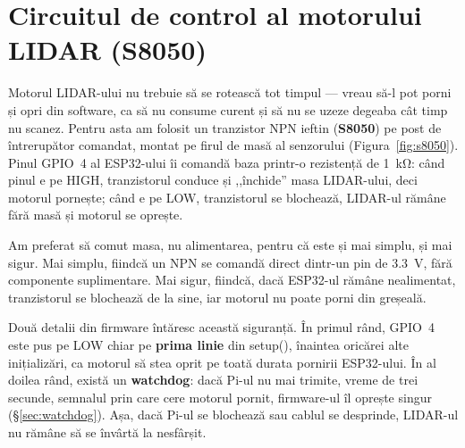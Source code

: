 \documentclass[a4paper,12pt,twoside,openany]{report}
\renewcommand{\texttt}[1]{\textnormal{#1}}
\begin{document}
\section{Circuitul de control al motorului LIDAR (S8050)}
\label{sec:s8050}

Motorul LIDAR-ului nu trebuie să se rotească tot timpul — vreau să-l pot
porni și opri din software, ca să nu consume curent și să nu se uzeze degeaba
cât timp nu scanez. Pentru asta am folosit un tranzistor NPN ieftin
(\textbf{S8050}) pe post de întrerupător comandat, montat pe firul de masă al
senzorului (Figura~\ref{fig:s8050}). Pinul GPIO~4 al ESP32-ului îi comandă baza
printr-o rezistență de \SI{1}{\kilo\ohm}: când pinul e pe HIGH, tranzistorul
conduce și ,,închide'' masa LIDAR-ului, deci motorul pornește; când e pe LOW,
tranzistorul se blochează, LIDAR-ul rămâne fără masă și motorul se oprește.

Am preferat să comut masa, nu alimentarea, pentru că este și mai simplu, și mai
sigur. Mai simplu, fiindcă un NPN se comandă direct dintr-un pin de
\SI{3.3}{\volt}, fără componente suplimentare. Mai sigur, fiindcă, dacă
ESP32-ul rămâne nealimentat, tranzistorul se blochează de la sine, iar motorul
nu poate porni din greșeală.

Două detalii din firmware întăresc această siguranță. În primul rând, GPIO~4
este pus pe LOW chiar pe \textbf{prima linie} din \texttt{setup()}, înaintea
oricărei alte inițializări, ca motorul să stea oprit pe toată durata pornirii
ESP32-ului. În al doilea rând, există un \textbf{watchdog}: dacă Pi-ul nu mai
trimite, vreme de trei secunde, semnalul prin care cere motorul pornit,
firmware-ul îl oprește singur (§\ref{sec:watchdog}). Așa, dacă Pi-ul se
blochează sau cablul se desprinde, LIDAR-ul nu rămâne să se învârtă la
nesfârșit.
\end{document}
